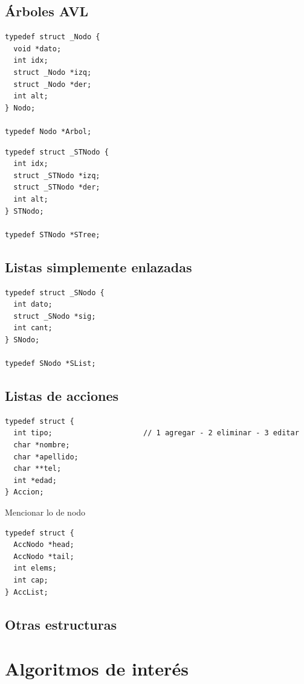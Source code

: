 \documentclass[11pt]{article}
\begin{document}
\subsection{Árboles AVL}

\begin{lstlisting}[style = CStyle]
typedef struct _Nodo {
  void *dato;
  int idx;
  struct _Nodo *izq;
  struct _Nodo *der;
  int alt;
} Nodo;

typedef Nodo *Arbol;
\end{lstlisting}

\begin{lstlisting}[style = CStyle]
typedef struct _STNodo {
  int idx;
  struct _STNodo *izq;
  struct _STNodo *der;
  int alt;
} STNodo;

typedef STNodo *STree;
\end{lstlisting}

\subsection{Listas simplemente enlazadas}

\begin{lstlisting}[style = CStyle]
typedef struct _SNodo {
  int dato;
  struct _SNodo *sig;
  int cant;
} SNodo;

typedef SNodo *SList;
\end{lstlisting}

\subsection{Listas de acciones}

\begin{lstlisting}[style = CStyle]
typedef struct {
  int tipo;                     // 1 agregar - 2 eliminar - 3 editar 
  char *nombre;
  char *apellido;
  char **tel;
  int *edad;
} Accion;
\end{lstlisting}

Mencionar lo de nodo

\begin{lstlisting}[style = CStyle]
typedef struct {
  AccNodo *head;
  AccNodo *tail;
  int elems;
  int cap;
} AccList;
\end{lstlisting}

\subsection{Otras estructuras}

\section{Algoritmos de inter\'es}
\end{document}
